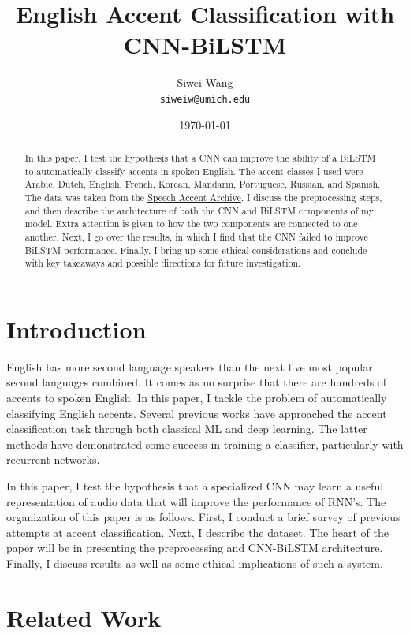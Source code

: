 \documentclass[11pt,a4paper]{article}
\title{English Accent Classification with CNN-BiLSTM}
\author{Siwei Wang \\ \texttt{siweiw@umich.edu}}
\date{\today}
\begin{document}
\maketitle
\begin{abstract}
  In this paper, I test the hypothesis that a CNN can improve the ability of a BiLSTM to automatically classify accents in spoken English. The accent classes I used were Arabic, Dutch, English, French, Korean, Mandarin, Portuguese, Russian, and Spanish. The data was taken from the \href{https://accent.gmu.edu/}{Speech Accent Archive}. I discuss the preprocessing steps, and then describe the architecture of both the CNN and BiLSTM components of my model. Extra attention is given to how the two components are connected to one another. Next, I go over the results, in which I find that the CNN failed to improve BiLSTM performance. Finally, I bring up some ethical considerations and conclude with key takeaways and possible directions for future investigation.
\end{abstract}

\section{Introduction} \label{sec:introduction}

English has more second language speakers than the next five most popular second languages combined. It comes as no surprise that there are hundreds of accents to spoken English. In this paper, I tackle the problem of automatically classifying English accents. Several previous works have approached the accent classification task through both classical ML and deep learning. The latter methods have demonstrated some success in training a classifier, particularly with recurrent networks.

In this paper, I test the hypothesis that a specialized CNN may learn a useful representation of audio data that will improve the performance of RNN's. The organization of this paper is as follows. First, I conduct a brief survey of previous attempts at accent classification. Next, I describe the dataset. The heart of the paper will be in presenting the preprocessing and CNN-BiLSTM architecture. Finally, I discuss results as well as some ethical implications of such a system.

\section{Related Work} \label{sec:related_work}
\end{document}
